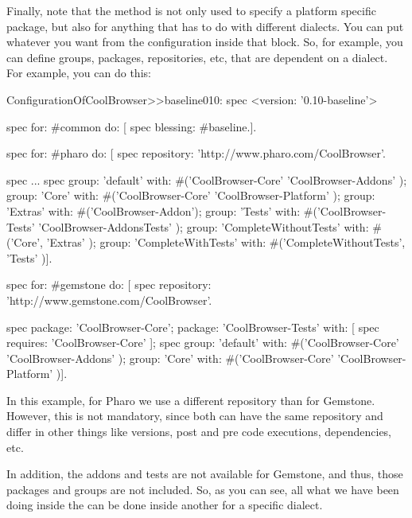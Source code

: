 \documentclass[a4paper,10pt,twoside]{book}
\begin{document}
Finally, note that the method  is not only used to specify a platform specific package, but also for anything that has to do with different dialects. You can put whatever you want from the configuration inside that block. So, for example, you can define groups, packages, repositories, etc, that are dependent on a dialect. For example, you can do this:


  \begin{code}{}
 ConfigurationOfCoolBrowser>>baseline010: spec 
	<version: '0.10-baseline'>
	
	spec for: #common do: [
		spec blessing: #baseline.].
	
	spec for: #pharo do: [
		spec repository: 'http://www.pharo.com/CoolBrowser'.
		
		spec 
			...
		spec 
			group: 'default' with: #('CoolBrowser-Core' 'CoolBrowser-Addons' );
			group: 'Core' with: #('CoolBrowser-Core' 'CoolBrowser-Platform' );
			group: 'Extras' with: #('CoolBrowser-Addon');
			group: 'Tests' with: #('CoolBrowser-Tests' 'CoolBrowser-AddonsTests' );
			group: 'CompleteWithoutTests' with: #('Core', 'Extras' );
			group: 'CompleteWithTests' with: #('CompleteWithoutTests', 'Tests' )].
			
	spec for: #gemstone do: [
		spec repository: 'http://www.gemstone.com/CoolBrowser'.
		
		spec 
			package: 'CoolBrowser-Core';
			package: 'CoolBrowser-Tests' with: [ spec requires: 'CoolBrowser-Core' ];
		spec 
			group: 'default' with: #('CoolBrowser-Core' 'CoolBrowser-Addons' );
			group: 'Core' with: #('CoolBrowser-Core' 'CoolBrowser-Platform' )].			

\end{code}	
	
In this example, for Pharo we use a different repository than for Gemstone. However, this is not mandatory, since both can have the same repository and differ in other things like versions, post and pre code executions, dependencies, etc. 

In addition, the addons and tests are not available for Gemstone, and thus, those packages and groups are not included. So, as you can see, all what we have been doing inside the  can be done inside another  for a specific dialect. 


%
%
\end{document}
